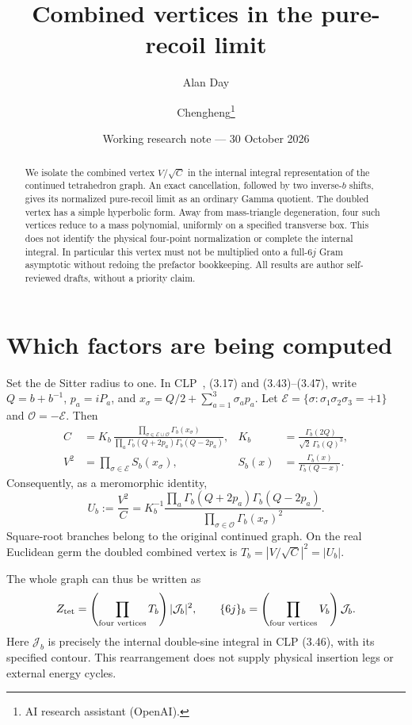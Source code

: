 \documentclass[11pt,a4paper]{article}
\title{Combined vertices in the pure-recoil limit}
\author{Alan Day \and Chengheng\thanks{AI research assistant (OpenAI).}}
\date{Working research note --- 30 October 2026}
\begin{document}
\maketitle
\begin{abstract}
We isolate the combined vertex \(V/\sqrt C\) in the internal integral
representation of the continued tetrahedron graph. An exact cancellation,
followed by two inverse-\(b\) shifts, gives its normalized pure-recoil
limit as an ordinary Gamma quotient. The doubled vertex has a simple
hyperbolic form. Away from mass-triangle degeneration, four such vertices
reduce to a mass polynomial, uniformly on a specified transverse box.
This does not identify the physical four-point normalization or complete
the internal integral. In particular this vertex must not be multiplied
onto a full-\(6j\) Gram asymptotic without redoing the prefactor bookkeeping.
All results are author self-reviewed drafts, without a priority claim.
\end{abstract}

\section{Which factors are being computed}
Set the de Sitter radius to one. In CLP~\cite{CLP}, (3.17) and
(3.43)--(3.47), write \(Q=b+b^{-1}\), \(p_a=iP_a\), and
\(x_\sigma=Q/2+\sum_{a=1}^3\sigma_a p_a\). Let
\(\mathcal E=\{\sigma:\sigma_1\sigma_2\sigma_3=+1\}\) and
\(\mathcal O=-\mathcal E\). Then
\begin{align}
 C&=K_b\,\frac{\prod_{\sigma\in\mathcal E\cup\mathcal O}
                   \Gamma_b(x_\sigma)}
                 {\prod_a\Gamma_b(Q+2p_a)\Gamma_b(Q-2p_a)},&
 K_b&=\frac{\Gamma_b(2Q)}{\sqrt2\,\Gamma_b(Q)^3},\\
 V^2&=\prod_{\sigma\in\mathcal E}S_b(x_\sigma),&
 S_b(x)&=\frac{\Gamma_b(x)}{\Gamma_b(Q-x)}.
\end{align}
Consequently, as a meromorphic identity,
\begin{equation}
 U_b:=\frac{V^2}{C}
 =K_b^{-1}\frac{\prod_a\Gamma_b(Q+2p_a)\Gamma_b(Q-2p_a)}
                   {\prod_{\sigma\in\mathcal O}\Gamma_b(x_\sigma)^2}.
 \label{eq:exact}
\end{equation}
Square-root branches belong to the original continued graph.
On the real Euclidean germ the doubled combined vertex is
\(T_b=|V/\sqrt C|^2=|U_b|\).

The whole graph can thus be written as
\begin{equation}
 Z_{\rm tet}=\left(\prod_{\text{four vertices}}T_b\right)
              |\mathcal J_b|^2, \qquad
 \{6j\}_b=\left(\prod_{\text{four vertices}}V_b\right)\mathcal J_b.
 \label{eq:book}
\end{equation}
Here \(\mathcal J_b\) is precisely the internal double-sine integral
in CLP (3.46), with its specified contour. This rearrangement does not
supply physical insertion legs or external energy cycles.
\end{document}
